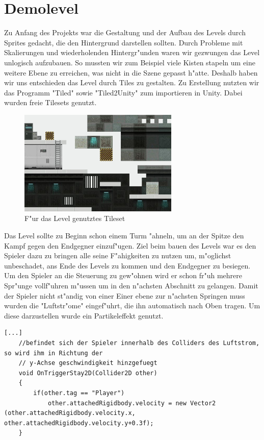 \chapter{Demolevel}
Zu Anfang des Projekts war die Gestaltung und der Aufbau des Levels durch Sprites gedacht, die den Hintergrund darstellen sollten. Durch Probleme mit Skalierungen und wiederholenden Hintergr"unden waren wir gezwungen das Level unlogisch aufzubauen. So mussten wir zum Beispiel viele Kisten stapeln um eine weitere Ebene zu erreichen, was nicht in die Szene gepasst h"atte. Deshalb haben wir uns entschieden das Level durch Tiles zu gestalten. Zu Erstellung nutzten wir das Programm "Tiled" sowie "Tiled2Unity" zum importieren in Unity. Dabei wurden freie Tilesets genutzt.

\begin{figure}
	\centering
	\includegraphics[height=5cm]{images/tileset.jpg}
	\caption{F"ur das Level genutztes Tileset}
	\label{fig:screen_pre}
\end{figure}


Das Level sollte zu Beginn schon einem Turm "ahneln, um an der Spitze den Kampf gegen den Endgegner einzuf"ugen. Ziel beim bauen des Levels war es den Spieler dazu zu bringen alle seine F"ahigkeiten zu nutzen um, m"oglichst unbeschadet, ans Ende des Levels zu kommen und den Endgegner zu besiegen.
Um den Spieler an die Steuerung zu gew"ohnen wird er schon fr"uh mehrere Spr"unge vollf"uhren m"ussen um in den n"achsten Abschnitt zu gelangen. Damit der Spieler nicht st"andig von einer Einer ebene zur n"achsten Springen muss wurden die "Luftstr"ome" eingef"uhrt, die ihn automatisch nach Oben tragen. Um diese darzustellen wurde ein Partikeleffekt genutzt.


\begin{lstlisting}[breaklines=true]
	[...]
	//befindet sich der Spieler innerhalb des Colliders des Luftstrom, so wird ihm in Richtung der
	// y-Achse geschwindigkeit hinzgefuegt
	void OnTriggerStay2D(Collider2D other)
	{
		if(other.tag == "Player")
			other.attachedRigidbody.velocity = new Vector2 (other.attachedRigidbody.velocity.x, other.attachedRigidbody.velocity.y+0.3f);
	}
\end{lstlisting}

